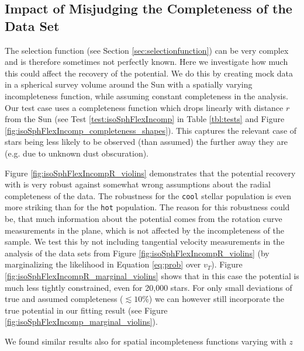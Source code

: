 \subsection{Impact of Misjudging the Completeness of the Data Set} \label{sec:results_incompR}

The selection function (see Section \ref{sec:selectionfunction}) can be very complex and is therefore sometimes not perfectly known. Here we investigate how much this could affect the recovery of the potential. We do this by creating mock data in a spherical survey volume around the Sun with a spatially varying incompleteness function, while assuming constant completeness in the \RM{} analysis. Our test case uses a completeness function which drops linearly with distance $r$ from the Sun (see Test \ref{test:isoSphFlexIncomp} in Table \ref{tbl:tests} and Figure \ref{fig:isoSphFlexIncomp_completeness_shapes}). This captures the relevant case of stars being less likely to be observed (than assumed) the further away they are (e.g. due to unknown dust obscuration). 

Figure \ref{fig:isoSphFlexIncompR_violins} demonstrates that the potential recovery with \RM{} is very robust against somewhat wrong assumptions about the radial completeness of the data. The robustness for the \texttt{cool} stellar population is even more striking than for the \texttt{hot} population. The reason for this robustness could be, that much information about the potential comes from the rotation curve measurements in the plane, which is not affected by the incompleteness of the sample. We test this by not including tangential velocity measurements in the analysis of the data sets from Figure \ref{fig:isoSphFlexIncompR_violins} (by marginalizing the likelihood in Equation \ref{eq:prob} over $v_T$). Figure \ref{fig:isoSphFlexIncompR_marginal_violins} shows that in this case the potential is much less tightly constrained, even for 20,000 stars. For only small deviations of true and assumed completeness ($\lesssim 10\%$) we can however still incorporate the true potential in our fitting result (see Figure \ref{fig:isoSphFlexIncomp_marginal_violins}).

We found similar results also for spatial incompleteness functions varying with $z$









